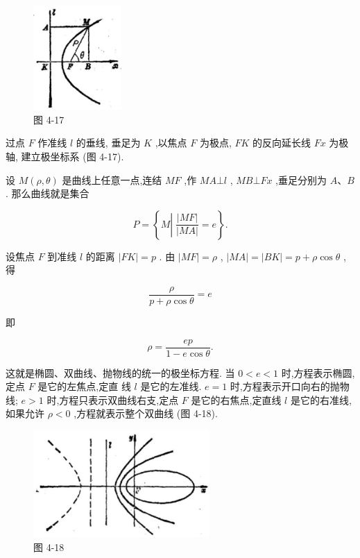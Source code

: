 \documentclass[lang=cn,newtx,10pt,scheme=chinese]{elegantbook}
\begin{document}
\begin{figure}[h]
  \centering
  \includegraphics[max width=0.3\textwidth]{images/01912cc2-ffb6-728e-9ae7-b113ff05c64b_179_840621.jpg}
  \caption{图 4-17}
\end{figure}



过点 \(F\) 作准线 \(l\) 的垂线, 垂足为 \(K\) ,以焦点 \(F\) 为极点, \({FK}\) 的反向延长线 \({Fx}\) 为极轴, 建立极坐标系 (图 4-17).

设 \(M\left( {\rho ,\theta }\right)\) 是曲线上任意一点,连结 \({MF}\) ,作 \({MA} \bot l\) , \({MB} \bot {Fx}\) ,垂足分别为 \(A\text{、}B\) . 那么曲线就是集合

\[
  P = \left\{ {M\left| {\;\frac{\left| MF\right| }{\left| MA\right| } = e}\right. }\right\} .
\]

设焦点 \(F\) 到准线 \(l\) 的距离 \(\left| {FK}\right| = p\) . 由 \(\left| {MF}\right| = \rho\) , \(\left| {MA}\right| = \left| {BK}\right| = p + \rho \cos \theta\) ,得

\[
  \frac{\rho }{p + \rho \cos \theta } = e
\]

即

\[
  \rho = \frac{ep}{1 - e\cos \theta }. \tag{1}
\]

这就是椭圆、双曲线、抛物线的统一的极坐标方程. 当 \(0 < e < 1\) 时,方程表示椭圆,定点 \(F\) 是它的左焦点,定直 线 \(l\) 是它的左准线. \(e = 1\) 时,方程表示开口向右的抛物线; \(e > 1\) 时,方程只表示双曲线右支,定点 \(F\) 是它的右焦点,定直线 \(l\) 是它的右准线,如果允许 \(\rho < 0\) ,方程就表示整个双曲线 (图 4-18).

\begin{figure}[h]
  \centering
  \includegraphics[max width=0.6\textwidth]{images/01912cc2-ffb6-728e-9ae7-b113ff05c64b_180_582043.jpg}
  \caption{图 4-18}
\end{figure}
\end{document}
